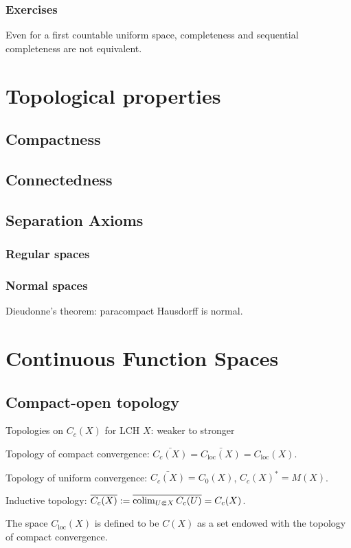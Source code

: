 \documentclass{../note}
\begin{document}
\section*{Exercises}
\begin{prb}
Even for a first countable uniform space, completeness and sequential completeness are not equivalent.
\end{prb}



\part{Topological properties}
\chapter{Compactness}



\chapter{Connectedness}



\chapter{Separation Axioms}
\section{Regular spaces}
\section{Normal spaces}
Dieudonne's theorem: paracompact Hausdorff is normal.










\part{Continuous Function Spaces}
\chapter{Compact-open topology}


Topologies on $C_c(X)$ for LCH $X$: weaker to stronger
\begin{parts}
\item Topology of compact convergence: $\bar{C_c(X)}=\bar{C_{\mathrm{loc}}(X)}=C_{\mathrm{loc}}(X)$.
\item Topology of uniform convergence: $\bar{C_c(X)}=C_0(X)$, $C_c(X)^*=M(X)$.
\item Inductive topology: $\overline{C_c(X)}:=\overline{\operatorname*{colim}_{U\Subset X}C_c(U)}=C_c(X)$.
\end{parts}
The space $C_{\mathrm{loc}}(X)$ is defined to be $C(X)$ as a set endowed with the topology of compact convergence.
\end{document}
